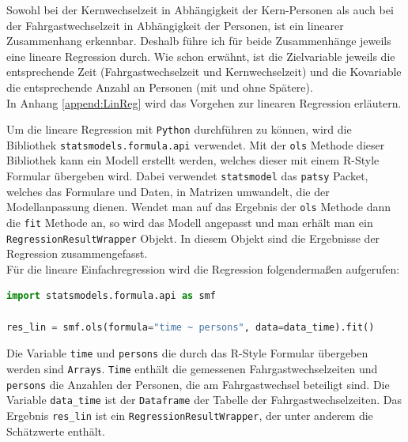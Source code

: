 Sowohl bei der Kernwechselzeit in Abhängigkeit der Kern-Personen als auch bei der Fahrgastwechselzeit in Abhängigkeit der Personen, ist ein linearer Zusammenhang erkennbar. Deshalb führe ich für beide Zusammenhänge jeweils eine lineare Regression durch. Wie schon erwähnt, ist die Zielvariable jeweils die entsprechende Zeit (Fahrgastwechselzeit und Kernwechselzeit) und die Kovariable die entsprechende Anzahl an Personen (mit und ohne Spätere). \\
In Anhang \ref{append:LinReg} wird das Vorgehen zur linearen Regression erläutern.

Um die lineare Regression mit \texttt{Python} durchführen zu können, wird die Bibliothek \texttt{statsmodels.formula.api} verwendet. Mit der \texttt{ols} Methode dieser Bibliothek kann ein Modell erstellt werden, welches dieser mit einem R-Style Formular übergeben wird. Dabei verwendet \texttt{statsmodel} das \texttt{patsy} Packet, welches das Formulare und Daten, in Matrizen umwandelt, die der Modellanpassung dienen. Wendet man auf das Ergebnis der \texttt{ols} Methode dann die \texttt{fit} Methode an, so wird das Modell angepasst und  man erhält man ein \texttt{RegressionResultWrapper} Objekt. In diesem Objekt sind die Ergebnisse der Regression zusammengefasst. \\
Für die lineare Einfachregression wird die Regression folgendermaßen aufgerufen:
\begin{lstlisting}[language=Python]
import statsmodels.formula.api as smf

res_lin = smf.ols(formula="time ~ persons", data=data_time).fit()
\end{lstlisting}
Die Variable \texttt{time} und \texttt{persons} die durch das R-Style Formular übergeben werden sind \texttt{Arrays}. \texttt{Time} enthält die gemessenen Fahrgastwechselzeiten und \texttt{persons} die Anzahlen der Personen, die am Fahrgastwechsel beteiligt sind. Die Variable \texttt{data\_time} ist der \texttt{Dataframe} der Tabelle der Fahrgastwechselzeiten. Das Ergebnis \texttt{res\_lin} ist ein \texttt{RegressionResultWrapper}, der unter anderem die Schätzwerte enthält.

